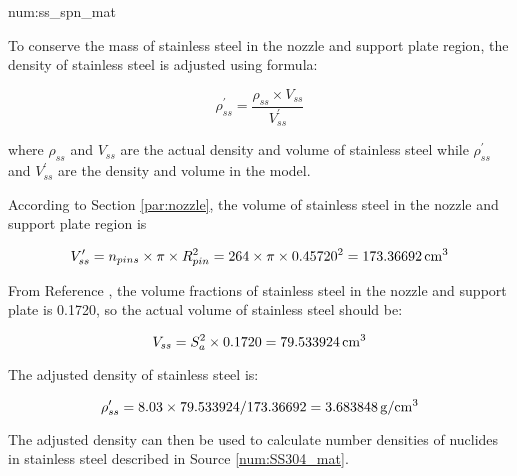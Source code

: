 \begin{numitem}{num:ss_spn_mat}

To conserve the mass of stainless steel in the nozzle and support plate region,
the density of stainless steel is adjusted using formula:

\[
    \rho^\prime_{ss} = \frac{\rho_{ss} \times V_{ss}}{V^\prime_{ss}}
\]

where $\rho_{ss}$ and $V_{ss}$ are the actual density and volume of stainless steel
while $\rho^\prime_{ss}$ and $V^\prime_{ss}$ are the density and volume
in the model.

According to Section \ref{par:nozzle}, the volume of stainless steel in the nozzle and
support plate region is

\[
   V^\prime_{ss} = n_{pins}\times \pi \times R_{pin}^2 = 264\times\pi\times 0.45720^2 = 173.36692\,\rm{cm^3}
\]

From Reference \cite{ml033530020}, the volume fractions of stainless steel in the nozzle 
and support plate is 0.1720, so the actual volume of stainless steel should be:

\[
    V_{ss} = S_a^2\times 0.1720 = 79.533924\,\rm{cm^3}
\]


The adjusted density of stainless steel is:

\[
    \rho^\prime_{ss} = 8.03 \times 79.533924 / 173.36692 = 3.683848\,\rm{g/cm^3}
\]

The adjusted density can then be used to calculate number densities 
of nuclides in stainless steel described in Source \ref{num:SS304_mat}.


\end{numitem}

